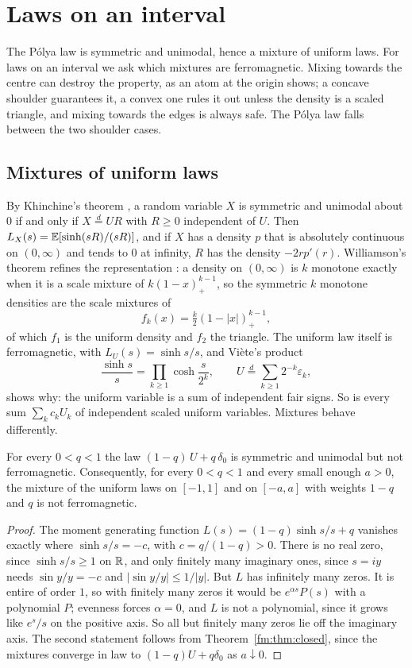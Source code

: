 \section{Laws on an interval}\label{ch:fminterval}

The P\'olya law is symmetric and unimodal, hence a mixture of uniform laws. For laws on an interval we ask which mixtures are ferromagnetic. Mixing towards the centre can destroy the property, as an atom at the origin shows; a concave shoulder guarantees it, a convex one rules it out unless the density is a scaled triangle, and mixing towards the edges is always safe. The P\'olya law falls between the two shoulder cases.

\subsection{Mixtures of uniform laws}\label{fm:sec:khinchine}

By Khinchine's theorem \cite{Feller71}, a random variable $X$ is symmetric and unimodal about $0$ if and only if $X\overset d=UR$ with $R\ge0$ independent of $U$. Then $L_X(s)=\mathbb{E}[\sinh(sR)/(sR)]$, and if $X$ has a density $p$ that is absolutely continuous on $(0,\infty)$ and tends to $0$ at infinity, $R$ has the density $-2rp'(r)$. Williamson's theorem refines the representation \cite{Williamson}: a density on $(0,\infty)$ is $k$ monotone exactly when it is a scale mixture of $k(1-x)_+^{k-1}$, so the symmetric $k$ monotone densities are the scale mixtures of
\[
f_k(x)=\tfrac k2(1-|x|)_+^{k-1},
\]
of which $f_1$ is the uniform density and $f_2$ the triangle. The uniform law itself is ferromagnetic, with $L_U(s)=\sinh s/s$, and Vi\`ete's product
\[
\frac{\sinh s}s=\prod_{k\ge1}\cosh\frac s{2^k},\qquad U\overset d=\sum_{k\ge1}2^{-k}\varepsilon_k,
\]
shows why: the uniform variable is a sum of independent fair signs. So is every sum $\sum_kc_kU_k$ of independent scaled uniform variables. Mixtures behave differently.

\begin{theorem}\label{fm:thm:atom}
For every $0<q<1$ the law $(1-q)\,U+q\,\delta_0$ is symmetric and unimodal but not ferromagnetic. Consequently, for every $0<q<1$ and every small enough $a>0$, the mixture of the uniform laws on $[-1,1]$ and on $[-a,a]$ with weights $1-q$ and $q$ is not ferromagnetic.
\end{theorem}

\begin{proof}
The moment generating function $L(s)=(1-q)\sinh s/s+q$ vanishes exactly where $\sinh s/s=-c$, with $c=q/(1-q)>0$. There is no real zero, since $\sinh s/s\ge1$ on $\mathbb{R}$, and only finitely many imaginary ones, since $s=iy$ needs $\sin y/y=-c$ and $|\sin y/y|\le1/|y|$. But $L$ has infinitely many zeros. It is entire of order $1$, so with finitely many zeros it would be $e^{\alpha s}P(s)$ with a polynomial $P$; evenness forces $\alpha=0$, and $L$ is not a polynomial, since it grows like $e^s/s$ on the positive axis. So all but finitely many zeros lie off the imaginary axis. The second statement follows from Theorem~\ref{fm:thm:closed}, since the mixtures converge in law to $(1-q)U+q\delta_0$ as $a\downarrow0$.
\end{proof}

